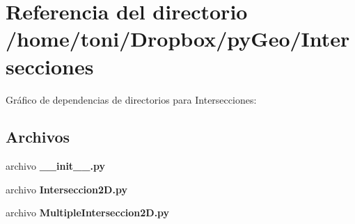 \section{Referencia del directorio /home/toni/\-Dropbox/py\-Geo/\-Intersecciones}
\label{dir_edb56d85aea1cc7b86997e8eb57858a7}
Gráfico de dependencias de directorios para Intersecciones\-:
\subsection*{Archivos}
\begin{DoxyCompactItemize}
\item 
archivo {\bf \-\_\-\-\_\-init\-\_\-\-\_\-.\-py}
\item 
archivo {\bf Interseccion2\-D.\-py}
\item 
archivo {\bf Multiple\-Interseccion2\-D.\-py}
\end{DoxyCompactItemize}
